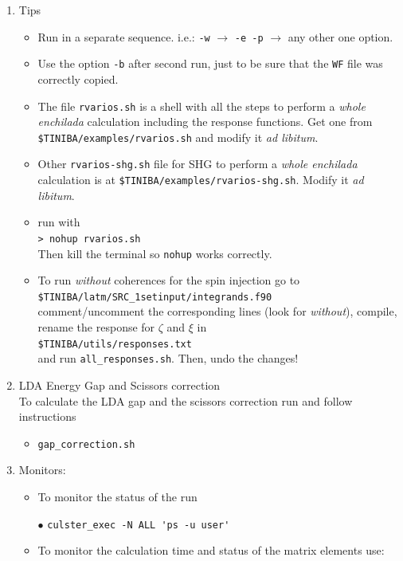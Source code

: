 \documentclass[12pt,leqno]{article}
\numberwithin{equation}{section}
\begin{document}
\begin{enumerate}
\item Tips
\begin{itemize}
\item Run in a separate sequence. i.e.:
  \verb=-w= $\to$   \verb=-e -p= $\to$   any other one option.
\item Use the option \verb=-b= after second run, just to be sure that
  the \verb=WF= file was correctly copied. 
\item The file \verb=rvarios.sh= is a shell with all the steps to
  perform a {\it whole enchilada} calculation including the response
  functions. Get one from \verb=$TINIBA/examples/rvarios.sh= and
  modify it {\it ad libitum}.
\item Other \verb=rvarios-shg.sh= file for SHG to
  perform a {\it whole enchilada} calculation is at
 \verb=$TINIBA/examples/rvarios-shg.sh=.
  Modify it {\it ad libitum}.
\item run with\\ \verb=> nohup rvarios.sh=\\
Then kill the terminal so
  \verb=nohup= works correctly.
\item To run {\it without} coherences for the spin injection go to\\ 
\verb=$TINIBA/latm/SRC_1setinput/integrands.f90=\\
comment/uncomment the corresponding lines (look for {\it without}),
compile, rename the response for $\zeta$ and $\xi$ in\\
 \verb=$TINIBA/utils/responses.txt=\\
and run \verb=all_responses.sh=. Then, undo the changes!  
\end{itemize}

\item LDA Energy Gap and Scissors correction\\
To calculate the LDA gap and the scissors correction run and follow instructions
\begin{itemize}
\item \verb=gap_correction.sh=
\end{itemize}
\item Monitors:
\begin{itemize}
\item To monitor the status of the run

$\bullet$ \verb=culster_exec -N ALL 'ps -u user'=

\item To monitor the calculation time and status of the matrix
  elements use:


\end{itemize}
\end{enumerate}
\end{document}
